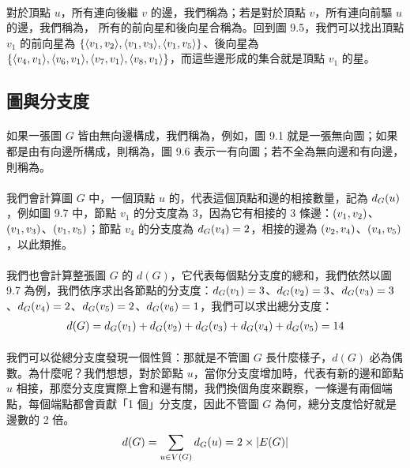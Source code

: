 \documentclass[12pt,a4paper,oneside]{report}
\begin{document}
\begin{CJK}{UTF8}{bkai}
\paragraph{}對於頂點 $u$，所有連向後繼 $v$ 的邊，我們稱為；若是對於頂點 $v$，所有連向前驅 $u$ 的邊，我們稱為， 所有的前向星和後向星合稱為。回到圖 9.5，我們可以找出頂點 $v_1$ 的前向星為 $\{\langle{}{{v_1},{v_2}}\rangle{},\langle{}{{v_1},{v_3}}\rangle{},\langle{}{{v_1},{v_5}}\rangle{}\}$、後向星為 $\{\langle{}{{v_4},{v_1}}\rangle{}\\,\langle{}{{v_6},{v_1}}\rangle{},\langle{}{{v_7},{v_1}}\rangle{},\langle{}{{v_8},{v_1}}\rangle{}\}$，而這些邊形成的集合就是頂點 $v_1$ 的星。

\subsection{圖與分支度}
\paragraph{}如果一張圖 $G$ 皆由無向邊構成，我們稱為\textbf{}，例如，圖 9.1 就是一張無向圖；如果都是由有向邊所構成，則稱為\textbf{}，圖 9.6 表示一有向圖；若不全為無向邊和有向邊，則稱為。
\paragraph{}我們會計算圖 $G$ 中，一個頂點 $u$ 的\textbf{}，代表這個頂點和邊的相接數量，記為 $d_{G}{(u)}$，例如圖 9.7 中，節點 $v_1$ 的分支度為 3，因為它有相接的 3 條邊：$({v_1},{v_2})$、$({v_1},{v_3})$、$({v_1},{v_5})$；節點 $v_4$ 的分支度為 $d_{G}{(v_4)}=2$，相接的邊為 $({v_2},{v_4})$、$({v_4},{v_5})$，以此類推。
\paragraph{}我們也會計算整張圖 $G$ 的\textbf{} $d(G)$，它代表每個點分支度的總和，我們依然以圖 9.7 為例，我們依序求出各節點的分支度：$d_{G}{(v_1)}=3$、$d_{G}{(v_2)}=3$、$d_{G}{(v_3)}=3$、$d_{G}{(v_4)}=2$、$d_{G}{(v_5)}=2$、$d_{G}{(v_6)}=1$，我們可以求出總分支度：
\begin{align*}
d(G)=d_{G}{(v_1)}+d_{G}{(v_2)}+d_{G}{(v_3)}+d_{G}{(v_4)}+d_{G}{(v_5)}=14
\end{align*}
\paragraph{}我們可以從總分支度發現一個性質：那就是不管圖 $G$ 長什麼樣子，$d(G)$ 必為偶數。為什麼呢？我們想想，對於節點 $u$，當你分支度增加時，代表有新的邊和節點 $u$ 相接，那麼分支度實際上會和邊有關，我們換個角度來觀察，一條邊有兩個端點，每個端點都會貢獻「1 個」分支度，因此不管圖 $G$ 為何，總分支度恰好就是邊數的 2 倍。
\begin{align}
\label{eq-degree-twice-edges}
d(G)=\sum_{u\in{V(G)}}{d_{G}{(u)}}=2\times{|E(G)|}
\end{align}

\end{CJK}
\end{document}
